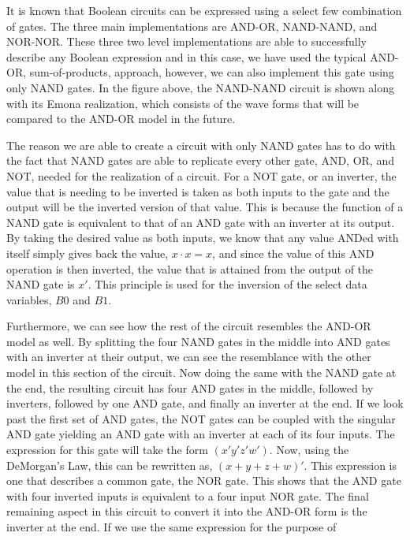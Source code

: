 \documentclass[12pt]{article}
\begin{document}
\par It is known that Boolean circuits can be expressed using a select few
combination of gates. The three main implementations are AND-OR, NAND-NAND, and
NOR-NOR. These three two level implementations are able to successfully
describe any Boolean expression and in this case, we have used the typical
AND-OR, sum-of-products, approach, however, we can also implement this gate
using only NAND gates. In the figure above, the NAND-NAND circuit is shown along
with its Emona realization, which consists of the wave forms that will be
compared to the AND-OR model in the future.
\par The reason we are able to create a circuit with only NAND gates has to do
with the fact that NAND gates are able to replicate every other gate, AND, OR,
and NOT, needed for the realization of a circuit. For a NOT gate, or an
inverter, the value that is needing to be inverted is taken as both inputs to
the gate and the output will be the inverted version of that value. This is
because the function of a NAND gate is equivalent to that of an AND gate with an
inverter at its output. By taking the desired value as both inputs, we know that
any value ANDed with itself simply gives back the value, $x \cdot x = x$, and
since the value of this AND operation is then inverted, the value that is
attained from the output of the NAND gate is $x'$. This principle is used for
the inversion of the select data variables, $B0$ and $B1$.
\par Furthermore, we can see how the rest of the circuit resembles the AND-OR
model as well. By splitting the four NAND gates in the middle into AND gates
with an inverter at their output, we can see the resemblance with the other
model in this section of the circuit. Now doing the same with the NAND gate at
the end, the resulting circuit has four AND gates in the middle, followed by
inverters, followed by one AND gate, and finally an inverter at the end. If we
look past the first set of AND gates, the NOT gates can be coupled with the
singular AND gate yielding an AND gate with an inverter at each of its four
inputs. The expression for this gate will take the form $(x'y'z'w')$. Now, using
the DeMorgan's Law, this can be rewritten as, $(x+y+z+w)'$. This expression is
one that describes a common gate, the NOR gate. This shows that the AND gate
with four inverted inputs is equivalent to a four input NOR gate. The final
remaining aspect in this circuit to convert it into the AND-OR form is the
inverter at the end. If we use the same expression for the purpose of
\end{document}
